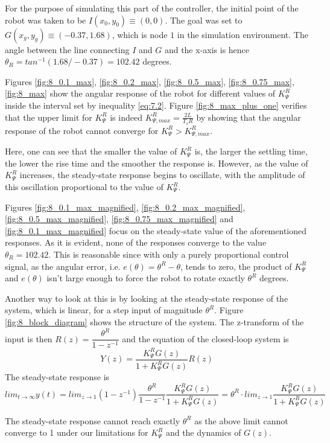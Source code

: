 For the purpose of simulating this part of the controller, the initial point of
the robot was taken to be $I (x_0, y_0) \equiv (0,0)$. The goal was set to
$G (x_g, y_g) \equiv (-0.37, 1.68)$, which is node $1$ in the simulation
environment. The angle between the line connecting $I$ and $G$ and the
x-axis is hence $\theta_R = tan^{-1}(1.68 / -0.37) = 102.42$ degrees.

Figures \ref{fig:8_0.1_max}, \ref{fig:8_0.2_max}, \ref{fig:8_0.5_max},
\ref{fig:8_0.75_max}, \ref{fig:8_max} show the angular response of the robot
for different values of $K_{\Psi}^R$ inside the interval set by inequality
\ref{eq:7.2}. Figure \ref{fig:8_max_plus_one} verifies that the upper limit
for $K_{\Psi}^R$ is indeed $K_{\Psi,max}^R = \frac{2L}{T_s R}$ by showing that the
angular response of the robot cannot converge for $K_{\Psi}^R > K_{\Psi,max}^R$.

Here, one can see that the smaller the value of $K_{\Psi}^R$ is, the larger the
settling time, the lower the rise time and the smoother the response is. However,
as the value of $K_{\Psi}^R$ increases, the steady-state response begins to
oscillate, with the amplitude of this oscillation proportional to the value of
$K_{\Psi}^R$.

Figures \ref{fig:8_0.1_max_magnified}, \ref{fig:8_0.2_max_magnified},
\ref{fig:8_0.5_max_magnified}, \ref{fig:8_0.75_max_magnified} and
\ref{fig:8_0.1_max_magnified} focus on the steady-state value of the
aforementioned responses. As it is evident, none of the responses converge to
the value $\theta_R = 102.42$. This is reasonable since with only a purely
proportional control signal, as the angular error, i.e. $e(\theta) = \theta^R - \theta$,
tends to zero, the product of $K_{\Psi}^R$ and $e(\theta)$ isn't large enough
to force the robot to rotate exactly $\theta^R$ degrees.

Another way to look at this is by looking at the steady-state response of the
system, which is linear, for a step input of magnitude $\theta^R$. Figure
\ref{fig:8_block_diagram} shows the structure of the system. The z-transform of
the input is then $R(z) = \dfrac{\theta^R}{1 - z^{-1}}$ and the equation of the
closed-loop system is
$$Y(z) = \dfrac{K_{\Psi}^R G(z)}{1 + K_{\Psi}^R G(z)} R(z)$$
The steady-state response is
$$lim_{t \to \infty} y(t) = lim_{z \to 1} (1-z^{-1}) \dfrac{\theta^R}{1-z^{-1}}
\dfrac{K_{\Psi}^R G(z)}{1 + K_{\Psi}^R G(z)} = \theta^R \cdot lim_{z \to 1}
\dfrac{K_{\Psi}^R G(z)}{1 + K_{\Psi}^R G(z)}$$

The steady-state response cannot reach exactly $\theta^R$ as the above limit
cannot converge to 1 under our limitations for $K_{\Psi}^R$ and the dynamics of
$G(z)$.

